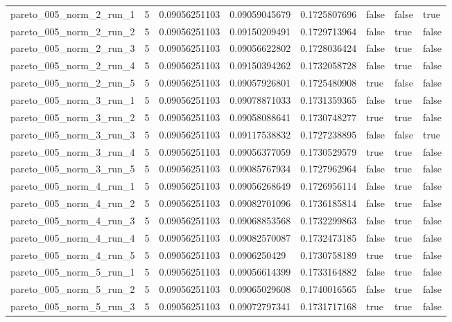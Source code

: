 \begin{tabular}{@{}llllllll@{}}
pareto\_005\_norm\_2\_run\_1 & 5 & 0.09056251103 & 0.09059045679 & 0.1725807696 & false & false & true \\
pareto\_005\_norm\_2\_run\_2 & 5 & 0.09056251103 & 0.09150209491 & 0.1729713964 & false & true & false \\
pareto\_005\_norm\_2\_run\_3 & 5 & 0.09056251103 & 0.09056622802 & 0.1728036424 & false & true & false \\
pareto\_005\_norm\_2\_run\_4 & 5 & 0.09056251103 & 0.09150394262 & 0.1732058728 & false & true & false \\
pareto\_005\_norm\_2\_run\_5 & 5 & 0.09056251103 & 0.09057926801 & 0.1725480908 & true & false & false \\
pareto\_005\_norm\_3\_run\_1 & 5 & 0.09056251103 & 0.09078871033 & 0.1731359365 & false & true & false \\
pareto\_005\_norm\_3\_run\_2 & 5 & 0.09056251103 & 0.09058088641 & 0.1730748277 & true & true & false \\
pareto\_005\_norm\_3\_run\_3 & 5 & 0.09056251103 & 0.09117538832 & 0.1727238895 & false & false & true \\
pareto\_005\_norm\_3\_run\_4 & 5 & 0.09056251103 & 0.09056377059 & 0.1730529579 & true & true & false \\
pareto\_005\_norm\_3\_run\_5 & 5 & 0.09056251103 & 0.09085767934 & 0.1727962964 & false & true & false \\
pareto\_005\_norm\_4\_run\_1 & 5 & 0.09056251103 & 0.09056268649 & 0.1726956114 & false & true & false \\
pareto\_005\_norm\_4\_run\_2 & 5 & 0.09056251103 & 0.09082701096 & 0.1736185814 & false & true & false \\
pareto\_005\_norm\_4\_run\_3 & 5 & 0.09056251103 & 0.09068853568 & 0.1732299863 & false & true & false \\
pareto\_005\_norm\_4\_run\_4 & 5 & 0.09056251103 & 0.09082570087 & 0.1732473185 & false & true & false \\
pareto\_005\_norm\_4\_run\_5 & 5 & 0.09056251103 & 0.0906250429 & 0.1730758189 & true & true & false \\
pareto\_005\_norm\_5\_run\_1 & 5 & 0.09056251103 & 0.09056614399 & 0.1733164882 & false & true & false \\
pareto\_005\_norm\_5\_run\_2 & 5 & 0.09056251103 & 0.09065029608 & 0.1740016565 & false & true & false \\
pareto\_005\_norm\_5\_run\_3 & 5 & 0.09056251103 & 0.09072797341 & 0.1731717168 & true & true & false \\

\end{tabular}
